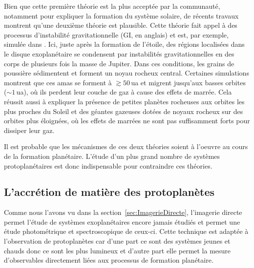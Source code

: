 Bien que cette première théorie est la plus acceptée par la communauté, notamment pour expliquer la formation du système solaire, de récents travaux montrent qu'une deuxième théorie est plausible. Cette théorie fait appel à des processus d'instabilité gravitationnelle (\ac{GI}, en anglais) et est, par exemple, simulée dans \cite{nayakshin2017}. Ici, juste après la formation de l'étoile, des régions localisées dans le disque exoplanétaire se condensent par instabilités gravitationnelles en des corps de plusieurs fois la masse de Jupiter. Dans ces conditions, les grains de poussière sédimentent et forment un noyau rocheux central. Certaines simulations \citep{boley2010} montrent que ces amas se forment à $\gtrsim 50 \,$ua et migrent jusqu'aux basses orbites ($\sim 1 \,$ua), où ils perdent leur couche de gaz à cause des effets de marrée. Cela réussit aussi à expliquer la présence de petites planètes rocheuses aux orbites les plus proches du Soleil et des géantes gazeuses dotées de noyaux rocheux sur des orbites plus éloignées, où les effets de marrées ne sont pas suffisamment forts pour dissiper leur gaz.

Il est probable que les mécanismes de ces deux théories soient à l'oeuvre au cours de la formation planétaire. L'étude d'un plus grand nombre de systèmes protoplanétaires est donc indispensable pour contraindre ces théories.


\subsection{L'accrétion de matière des protoplanètes}
\label{sec:AccretionAlpha}

Comme nous l'avons vu dans la section~\ref{sec:ImagerieDirecte}, l'imagerie directe permet l'étude de systèmes exoplanétaires encore jamais étudiés et permet une étude photométrique et spectroscopique de ceux-ci. Cette technique est adaptée à l'observation de protoplanètes car d'une part ce sont des systèmes jeunes et chauds donc ce sont les plus lumineux et d'autre part elle permet la mesure d'observables directement liées aux processus de formation planétaire.

